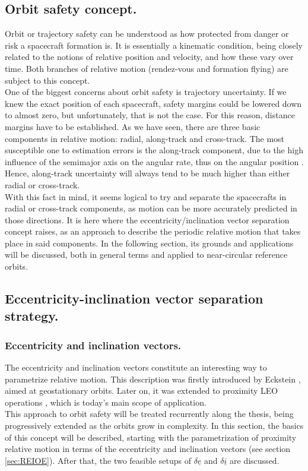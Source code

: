 	\subsection{Orbit safety concept.}\label{sec:Orbit_safety}
	\indent Orbit or trajectory safety can be understood as how protected from danger or risk a spacecraft formation is. It is essentially a kinematic condition, being closely related to the notions of relative position and velocity, and how these vary over time. Both branches of relative motion (\ie rendez-vous and formation flying) are subject to this concept. \\
	\indent One of the biggest concerns about orbit safety is trajectory uncertainty. If we knew the exact position of each spacecraft, safety margins could be lowered down to almost zero, but unfortunately, that is not the case. For this reason, distance margins have to be established. As we have seen, there are three basic components in relative motion: radial, along-track and cross-track. The most susceptible one to estimation errors is the along-track component, due to the high influence of the semimajor axis on the angular rate, thus on the angular position \cite{Eckstein}. Hence, along-track uncertainty will always tend to be much higher than either radial or cross-track.\\
	\indent With this fact in mind, it seems logical to try and separate the spacecrafts in radial or cross-track components, as motion can be more accurately predicted in those directions. It is here where the eccentricity/inclination vector separation concept raises, as an approach to describe the periodic relative motion that takes place in said components. In the following section, its grounds and applications will be discussed, both in general terms and applied to near-circular reference orbits.
	\subsection{Eccentricity-inclination vector separation strategy.}
		\subsubsection{Eccentricity and inclination vectors.}
		\indent The eccentricity and inclination vectors constitute an interesting way to parametrize relative motion. This description was firstly introduced by Eckstein \cite{Eckstein}, aimed at geostationary orbits. Later on, it was extended to proximity LEO operations \cite{Montenbruck_DAmico}, which is today's main scope of application. \\
		\indent This approach to orbit safety will be treated recurrently along the thesis, being progressively extended as the orbits grow in complexity. In this section, the basics of this concept will be described, starting with the parametrization of proximity relative motion in terms of the eccentricity and inclination vectors (see section \ref{sec:REIOE}). After that, the two feasible setups of $\delta \underline{e}$ and $\delta \underline{i}$ are discussed.
